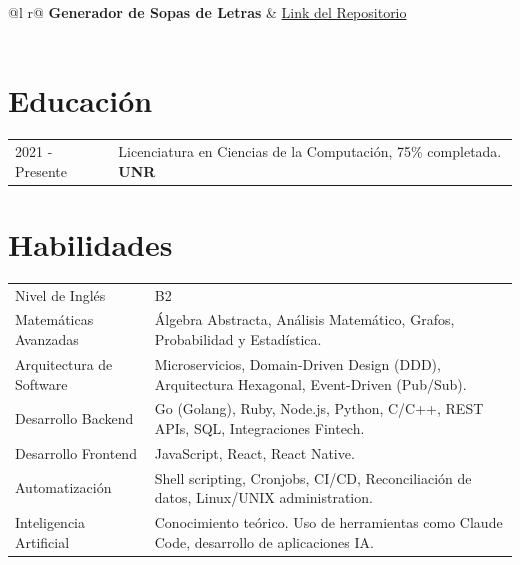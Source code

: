 \documentclass[a4paper,12pt]{article}
\begin{document}
\begin{tabularx}{\linewidth}{ @{}l r@{} }
\textbf{Generador de Sopas de Letras} & \hfill \href{https://github.com/llascola/sopa-letras-backtracking}{Link del Repositorio} \\[3.75pt]
  \\
\end{tabularx}

\section{Educación}
\begin{tabularx}{\linewidth}{@{}l L@{}}
2021 - Presente & Licenciatura en Ciencias de la Computación, 75\% completada. \textbf{UNR} \\
\end{tabularx}

\section{Habilidades}
\begin{tabularx}{\linewidth}{@{}l L@{}}
Nivel de Inglés           & B2 \\
Matemáticas Avanzadas     & Álgebra Abstracta, Análisis Matemático, Grafos, Probabilidad y Estadística. \\
Arquitectura de Software  & Microservicios, Domain-Driven Design (DDD), Arquitectura Hexagonal, Event-Driven (Pub/Sub). \\
Desarrollo Backend        & Go (Golang), Ruby, Node.js, Python, C/C++, REST APIs, SQL, Integraciones Fintech. \\
Desarrollo Frontend       & JavaScript, React, React Native. \\
Automatización            & Shell scripting, Cronjobs, CI/CD, Reconciliación de datos, Linux/UNIX administration. \\
Inteligencia Artificial   & Conocimiento teórico. Uso de herramientas como Claude Code, desarrollo de aplicaciones IA. \\
\end{tabularx}
\end{document}
